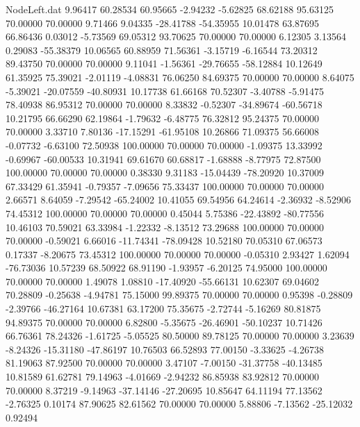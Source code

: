 \begin{filecontents}{NodeLeft.dat}
   9.96417   60.28534   60.95665    -2.94232   -5.62825   68.62188   95.63125   70.00000   70.00000    9.71466    9.04335  -28.41788  -54.35955
  10.01478   63.87695   66.86436     0.03012   -5.73569   69.05312   93.70625   70.00000   70.00000    6.12305    3.13564    0.29083  -55.38379
  10.06565   60.88959   71.56361    -3.15719   -6.16544   73.20312   89.43750   70.00000   70.00000    9.11041   -1.56361  -29.76655  -58.12884
  10.12649   61.35925   75.39021    -2.01119   -4.08831   76.06250   84.69375   70.00000   70.00000    8.64075   -5.39021  -20.07559  -40.80931
  10.17738   61.66168   70.52307    -3.40788   -5.91475   78.40938   86.95312   70.00000   70.00000    8.33832   -0.52307  -34.89674  -60.56718
  10.21795   66.66290   62.19864    -1.79632   -6.48775   76.32812   95.24375   70.00000   70.00000    3.33710    7.80136  -17.15291  -61.95108
  10.26866   71.09375   56.66008    -0.07732   -6.63100   72.50938  100.00000   70.00000   70.00000   -1.09375   13.33992   -0.69967  -60.00533
  10.31941   69.61670   60.68817    -1.68888   -8.77975   72.87500  100.00000   70.00000   70.00000    0.38330    9.31183  -15.04439  -78.20920
  10.37009   67.33429   61.35941    -0.79357   -7.09656   75.33437  100.00000   70.00000   70.00000    2.66571    8.64059   -7.29542  -65.24002
  10.41055   69.54956   64.24614    -2.36932   -8.52906   74.45312  100.00000   70.00000   70.00000    0.45044    5.75386  -22.43892  -80.77556
  10.46103   70.59021   63.33984    -1.22332   -8.13512   73.29688  100.00000   70.00000   70.00000   -0.59021    6.66016  -11.74341  -78.09428
  10.52180   70.05310   67.06573     0.17337   -8.20675   73.45312  100.00000   70.00000   70.00000   -0.05310    2.93427    1.62094  -76.73036
  10.57239   68.50922   68.91190    -1.93957   -6.20125   74.95000  100.00000   70.00000   70.00000    1.49078    1.08810  -17.40920  -55.66131
  10.62307   69.04602   70.28809    -0.25638   -4.94781   75.15000   99.89375   70.00000   70.00000    0.95398   -0.28809   -2.39766  -46.27164
  10.67381   63.17200   75.35675    -2.72744   -5.16269   80.81875   94.89375   70.00000   70.00000    6.82800   -5.35675  -26.46901  -50.10237
  10.71426   66.76361   78.24326    -1.61725   -5.05525   80.50000   89.78125   70.00000   70.00000    3.23639   -8.24326  -15.31180  -47.86197
  10.76503   66.52893   77.00150    -3.33625   -4.26738   81.19063   87.92500   70.00000   70.00000    3.47107   -7.00150  -31.37758  -40.13485
  10.81589   61.62781   79.14963    -4.01669   -2.94232   86.85938   83.92812   70.00000   70.00000    8.37219   -9.14963  -37.14146  -27.20695
  10.85647   64.11194   77.13562    -2.76325    0.10174   87.90625   82.61562   70.00000   70.00000    5.88806   -7.13562  -25.12032    0.92494

\end{filecontents}
